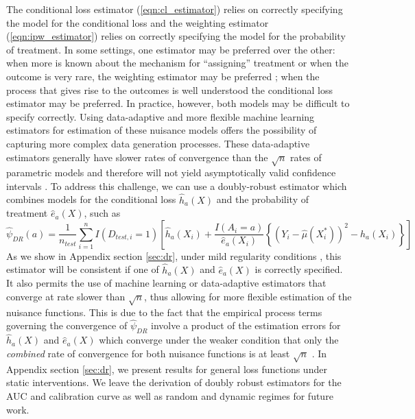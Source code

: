 The conditional loss estimator (\ref{eqn:cl_estimator}) relies on correctly specifying the model for the conditional loss and the weighting estimator (\ref{eqn:ipw_estimator})  relies on correctly specifying the model for the probability of treatment. In some settings, one estimator may be preferred over the other: when more is known about the mechanism for ``assigning'' treatment or when the outcome is very rare, the weighting estimator may be preferred \cite{robins_estimating_1992,braitman_rare_2002}; when the process that gives rise to the outcomes is well understood the conditional loss estimator may be preferred. In practice, however, both models may be difficult to specify correctly. Using data-adaptive and more flexible machine learning estimators for estimation of these nuisance models offers the possibility of capturing more complex data generation processes. These data-adaptive estimators generally have slower rates of convergence than the $\sqrt{n}$ rates of parametric models and therefore will not yield asymptotically valid confidence intervals \cite{chernozhukov_doubledebiased_2018}. To address this challenge, we can use a doubly-robust estimator which combines models for the conditional loss $\widehat{h}_a(X)$ and the probability of treatment $\widehat{e}_a(X)$, such as
\begin{equation}
    \widehat{\psi}_{DR}(a) = \frac{1}{n_{test}} \sum_{i=1}^n I(D_{test,i} = 1) \left[ \widehat{h}_a(X_i) + \frac{I(A_i = a)}{\widehat{e}_a(X_i)} \left\{ (Y_i - \widehat{\mu}(X^*_i))^2 - \widehat{h}_a(X_i)\right\}\right]
\end{equation}
As we show in Appendix section \ref{sec:dr}, under mild regularity conditions \cite{robins_higher_2008}, this estimator will be consistent if one of $\widehat{h}_a(X)$ and $\widehat{e}_a(X)$ is correctly specified. It also permits the use of machine learning or data-adaptive estimators that converge at rate slower than $\sqrt{n}$, thus allowing for more flexible estimation of the nuisance functions. This is due to the fact that the empirical process terms governing the convergence of $\widehat{\psi}_{DR}$ involve a product of the estimation errors for $\widehat{h}_a(X)$ and $\widehat{e}_a(X)$ which converge under the weaker condition that only the \textit{combined} rate of convergence for both nuisance functions is at least $\sqrt{n}$ \cite{chernozhukov_doubledebiased_2018}. In Appendix section \ref{sec:dr}, we present results for general loss functions under static interventions. We leave the derivation of doubly robust estimators for the AUC and calibration curve as well as random and dynamic regimes for future work.


